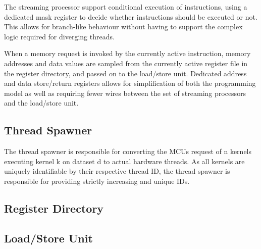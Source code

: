 The streaming processor support conditional execution of instructions, using a dedicated mask register to decide whether instructions should be executed or not.
This allows for branch-like behaviour without having to support the complex logic required for diverging threads.

When a memory request is invoked by the currently active instruction, memory addresses and data values are sampled from the currently active register file in the register directory, and passed on to the load/store unit.
Dedicated address and data store/return registers allows for simplification of both the programming model as well as requiring fewer wires between the set of streaming processors and the load/store unit.

\subsection{Thread Spawner}

The thread spawner is responsible for converting the MCUs request of n kernels executing kernel k on dataset d to actual hardware threads.
As all kernels are uniquely identifiable by their respective thread ID, the thread spawner is responsible for providing strictly increasing and unique IDs.


\subsection{Register Directory}

\subsection{Load/Store Unit}

